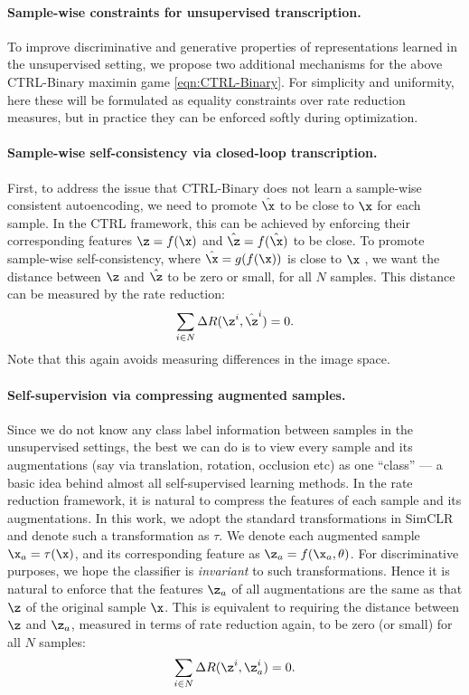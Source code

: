 \documentclass[../../book-main.tex]{subfiles}
\begin{document}
\paragraph{Sample-wise constraints for unsupervised transcription.} 
\label{sec:constraints}
To improve discriminative and generative properties of representations learned in the unsupervised setting, we propose two additional mechanisms for the above CTRL-Binary maximin game \eqref{eqn:CTRL-Binary}.  For simplicity and uniformity, here these will be formulated as equality constraints over rate reduction measures, but in practice they can be enforced softly during optimization.

\paragraph{Sample-wise self-consistency via closed-loop transcription.} 
First, to address the issue that CTRL-Binary does not learn a sample-wise consistent autoencoding, we need to promote $\hat \x$ to be close to $\x$ for each sample. In the CTRL framework, this can be achieved by enforcing their corresponding features $\z=f(\x)$ and $\hat \z = f(\hat \x)$ to be close. 
To promote sample-wise self-consistency, where $\hat{\x} = g(f(\x))$ is close to $\x$ , we want the distance between $\z$ and $\hat{\z}$ to be zero or small, for all $N$ samples.
This distance can be measured by the rate reduction:
\begin{align}
\sum_{i\in N} \Delta R(\z^i,\hat{\z}^i) = 0.
\label{eqn:sample-self-consistency}\vspace{-2mm}
\end{align}
Note that this again avoids measuring differences in the image space.

\paragraph{Self-supervision via compressing augmented samples.} 
Since we do not know any class label information between samples in the unsupervised settings, the best we can do is to view every sample and its augmentations (say via translation, rotation,  occlusion etc) as one ``class'' --- a basic idea behind almost all self-supervised learning methods. In the rate reduction framework, it is natural to compress the features of each sample and its augmentations. In this work, we adopt the standard transformations in SimCLR \cite{chen2020simple} and denote such a transformation as $\tau$. We denote each augmented sample $\x_a = \tau(\x)$, and its corresponding feature as $\z_a = f(\x_a, \theta) $. For discriminative purposes, we hope the classifier is {\em invariant} to such transformations. Hence it is natural to enforce that the features $\z_a$ of all augmentations are the same as that $\z$ of the original sample $\x$. This is equivalent to requiring the distance between $\z$  and  $\z_a$, measured in terms of rate reduction again, to be zero (or small) for all $N$ samples: 
\begin{align}
\sum_{i\in N} \Delta R(\z^i,\z_{a}^i) = 0.
\label{eqn:sample-compression}\vspace{-3mm}
\end{align}
\end{document}
